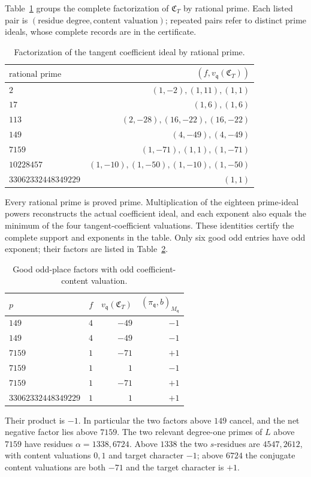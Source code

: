 \documentclass[11pt,a4paper]{article}
\theoremstyle{definition}\newtheorem{definition}[theorem]{Definition}
\theoremstyle{remark}\newtheorem{remark}[theorem]{Remark}
\begin{document}
Table~\ref{tab:6} groups the complete factorization of
$\mathfrak C_T$ by rational prime.  Each listed pair is
$(\text{residue degree},\text{content valuation})$; repeated pairs
refer to distinct prime ideals, whose complete records are in the
certificate.
\begin{table}[htbp]
\centering
\caption{Factorization of the tangent coefficient ideal by rational prime.}\label{tab:6}
\begin{tabular}{lr}
\toprule
$\text{rational prime}$ & $(f,v_{\mathfrak q}(\mathfrak C_T))$\\
\midrule
$2$ & $(1,-2),(1,11),(1,1)$\\
$17$ & $(1,6),(1,6)$\\
$113$ & $(2,-28),(16,-22),(16,-22)$\\
$149$ & $(4,-49),(4,-49)$\\
$7159$ & $(1,-71),(1,1),(1,-71)$\\
$10228457$ & $(1,-10),(1,-50),(1,-10),(1,-50)$\\
$33062332448349229$ & $(1,1)$\\
\bottomrule
\end{tabular}
\end{table}
Every rational prime is proved prime.  Multiplication of the eighteen
prime-ideal powers reconstructs the actual coefficient ideal, and each
exponent also equals the minimum of the four tangent-coefficient
valuations.  These identities certify the complete support and exponents in the table.
Only six good odd entries have odd exponent; their factors are listed in Table~\ref{tab:7}.
\begin{table}[htbp]
\centering
\caption{Good odd-place factors with odd coefficient-content valuation.}\label{tab:7}
\begin{tabular}{lrrr}
\toprule
$p$ & $f$ & $v_{\mathfrak q}(\mathfrak C_T)$ & $(\pi_{\mathfrak q},b)_{M_{\mathfrak q}}$\\
\midrule
$149$ & $4$ & $-49$ & $-1$\\
$149$ & $4$ & $-49$ & $-1$\\
$7159$ & $1$ & $-71$ & $+1$\\
$7159$ & $1$ & $1$ & $-1$\\
$7159$ & $1$ & $-71$ & $+1$\\
$33062332448349229$ & $1$ & $1$ & $+1$\\
\bottomrule
\end{tabular}
\end{table}
Their product is $-1$.  In particular the two factors above $149$
cancel, and the net negative factor lies above $7159$.
The two relevant degree-one primes of $L$ above $7159$ have residues
$\alpha=1338,6724$.  Above $1338$ the two $s$-residues are
$4547,2612$, with content valuations $0,1$ and target character $-1$;
above $6724$ the conjugate content valuations are both $-71$ and
the target character is $+1$.
\end{document}

